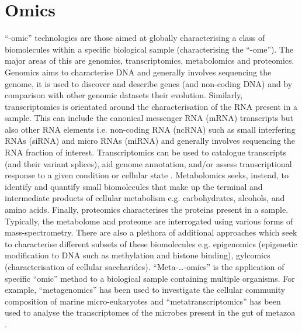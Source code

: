 \section{Omics}
``-omic'' technologies are those aimed at globally characterising a class of biomolecules 
within a specific biological sample (characterising the ``-ome''). The major areas of this
are genomics, transcriptomics, metabolomics and proteomics. 
Genomics aims to characterise DNA and generally involves sequencing the genome, it is used
to discover and describe genes (and non-coding DNA) and by comparison with other genomic
datasets their evolution.  Similarly, transcriptomics is orientated 
around the characterisation of the RNA present in a sample.  This can include
the canonical messenger RNA (mRNA) transcripts but also other RNA elements i.e.
non-coding RNA (ncRNA) such as small interfering RNAs (siRNA) and micro RNAs (miRNA) and
generally involves sequencing the RNA fraction of interest.
Transcriptomics can be used to catalogue transcripts (and their variant splices), 
aid genome annotation,  and/or assess transcriptional response to a given condition or cellular state \citep{Wang2009}.
Metabolomics seeks, instead, to identify and quantify small biomolecules that make up the terminal and
intermediate products of cellular metabolism e.g. carbohydrates, alcohols, and amino acids.  
Finally, proteomics characterises the proteins present in a sample. 
Typically, the metabolome and proteome are interrogated using various forms of mass-spectrometry.
There are also a plethora of additional approaches which seek to characterise
different subsets of these biomolecules e.g. epigenomics (epigenetic modification to DNA such as methylation
and histone binding), gylcomics (characterisation of cellular saccharides).
``Meta-\ldots-omics'' is the application of specific ``omic'' method to a biological sample 
containing multiple organisms. For example, ``metagenomics'' has been used to investigate
the cellular community composition of marine micro-eukaryotes \citep{Cuvelier2010}
and ``metatranscriptomics'' has been used to analyse the transcriptomes of the microbes present in the gut of metazoa \citep{Perez-Cobas2013}.


